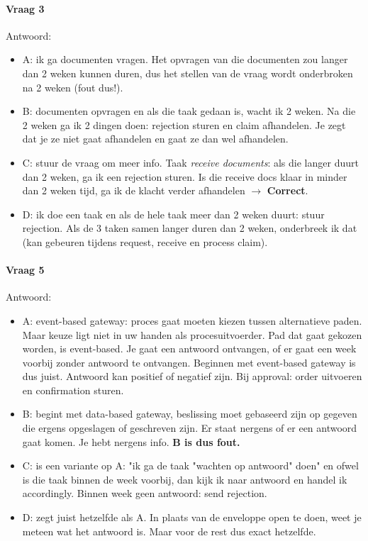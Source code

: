 \documentclass[10pt,a4paper]{report}
\begin{document}
\paragraph{Vraag 3}Antwoord:
\begin{itemize}
\item A: ik ga documenten vragen. Het opvragen van die documenten zou langer dan 2 weken kunnen duren, dus het stellen van de vraag wordt onderbroken na 2 weken (fout dus!).
\item B: documenten opvragen en als die taak gedaan is, wacht ik 2 weken. Na die 2 weken ga ik 2 dingen doen: rejection sturen en claim afhandelen. Je zegt dat je ze niet gaat afhandelen en gaat ze dan wel afhandelen.
\item C: stuur de vraag om meer info. Taak \textit{receive documents}: als die langer duurt dan 2 weken, ga ik een rejection sturen. Is die receive docs klaar in minder dan 2 weken tijd, ga ik de klacht verder afhandelen $\rightarrow$ \textbf{Correct}.
\item D: ik doe een taak en als de hele taak meer dan 2 weken duurt: stuur rejection. Als de 3 taken samen langer duren dan 2 weken, onderbreek ik dat (kan gebeuren tijdens request, receive en process claim).
\end{itemize}

\paragraph{Vraag 5}Antwoord: 
\begin{itemize}
\item A: event-based gateway: proces gaat moeten kiezen tussen alternatieve paden. Maar keuze ligt niet in uw handen als procesuitvoerder. Pad dat gaat gekozen worden, is event-based. Je gaat een antwoord ontvangen, of er gaat een week voorbij zonder antwoord te ontvangen. Beginnen met event-based gateway is dus juist. Antwoord kan positief of negatief zijn. Bij approval: order uitvoeren en confirmation sturen.
\item B: begint met data-based gateway, beslissing moet gebaseerd zijn op gegeven die ergens opgeslagen of geschreven zijn. Er staat nergens of er een antwoord gaat komen. Je hebt nergens info. \textbf{B is dus fout.}
\item C: is een variante op A: "ik ga de taak "wachten op antwoord" doen" en ofwel is die taak binnen de week voorbij, dan kijk ik naar antwoord en handel ik accordingly. Binnen week geen antwoord: send rejection.
\item D: zegt juist hetzelfde als A. In plaats van de enveloppe open te doen, weet je meteen wat het antwoord is. Maar voor de rest dus exact hetzelfde.
\end{itemize}
\end{document}
